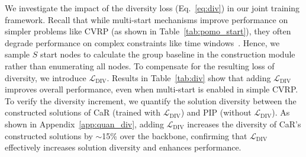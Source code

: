 \documentclass{article} %
\begin{document}
\begin{table}
\vspace{-10pt}
  \centering
  \caption{{Effects of $\mathcal{L}_{\text{DIV}}$.}}
  \vspace{-5pt}
\vspace{-10pt}
\label{tab:div}%
\end{table}
We investigate the impact of the diversity loss (Eq.~\ref{eq:div}) in our joint training framework. Recall that while multi-start mechanisms improve performance on simpler problems like CVRP (as shown in Table~\ref{tab:pomo_start}), they often degrade performance on complex constraints like time windows~\citep{bi2024learning}. Hence, we sample $S$ start nodes to calculate the group baseline in the construction module rather than enumerating all nodes. To compensate for the resulting loss of diversity, we introduce $\mathcal{L}_{\text{DIV}}$. Results in Table~\ref{tab:div} show that adding $\mathcal{L}_{\text{DIV}}$ improves overall performance, even when multi-start is enabled in simple CVRP. To verify the diversity increment, we quantify the solution diversity between the constructed solutions of CaR (trained with $\mathcal{L}_{\text{DIV}}$) and PIP (without $\mathcal{L}_{\text{DIV}}$). As shown in Appendix~\ref{app:quan_div}, adding $\mathcal{L}_{\text{DIV}}$ increases the diversity of CaR's constructed solutions by $\sim$15\% over the backbone, confirming that $\mathcal{L}_{\text{DIV}}$ effectively increases solution diversity and enhances performance.
\end{document}
